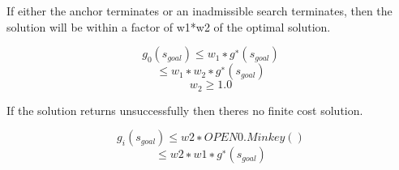 \documentclass[a4paper]{article}
\begin{document}
If either the anchor terminates or an inadmissible search terminates, then the solution will be within a factor of w1*w2 of the optimal solution.

\begin{equation}
g_{0}(s_{goal}) ≤ w_{1} ∗ g^{∗}(s_{goal})
\end{equation}
\begin{equation}
≤ w_{1} ∗ w_{2} ∗ g^{∗}(s_{goal})
\end{equation}
\begin{equation}
w_{2} ≥ 1.0
\end{equation}

If the solution returns unsuccessfully then theres no finite cost solution.

\begin{equation}
g_{i}(s_{goal}) ≤ w2 ∗ OPEN0.Minkey()
\end{equation}
\begin{equation}
≤ w2 ∗ w1 ∗ g^{∗}(s_{goal})
\end{equation}
\end{document}
